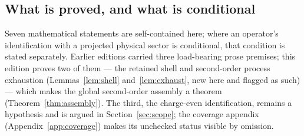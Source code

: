 \documentclass[11pt]{article}
\theoremstyle{plain}
\theoremstyle{definition}
\theoremstyle{remark}
\begin{document}
\subsection*{What is proved, and what is conditional}

Seven mathematical statements are self-contained here; where an operator's
identification with a projected physical sector is conditional, that condition
is stated separately. Earlier editions carried three load-bearing prose
premises; this edition proves two of them --- the retained shell and
second-order process exhaustion (Lemmas~\ref{lem:shell}
and~\ref{lem:exhaust}, new here and flagged as such) --- which makes the
global second-order assembly a theorem (Theorem~\ref{thm:assembly}). The
third, the charge-even identification, remains a hypothesis and is argued in
Section~\ref{sec:scope}; the coverage appendix
(Appendix~\ref{app:coverage}) makes its unchecked status visible by
omission.
\end{document}
